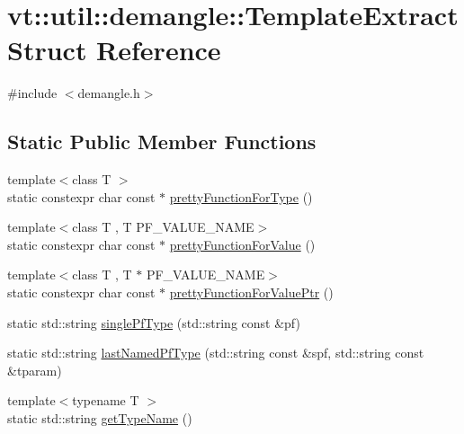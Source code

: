 \hypertarget{structvt_1_1util_1_1demangle_1_1_template_extract}{}\section{vt\+:\+:util\+:\+:demangle\+:\+:Template\+Extract Struct Reference}
\label{structvt_1_1util_1_1demangle_1_1_template_extract}


{\ttfamily \#include $<$demangle.\+h$>$}

\subsection*{Static Public Member Functions}
\begin{DoxyCompactItemize}
\item 
{\footnotesize template$<$class T $>$ }\\static constexpr char const  $\ast$ \hyperlink{structvt_1_1util_1_1demangle_1_1_template_extract_a544c77a181038fc1de063fe3d3fc761d}{pretty\+Function\+For\+Type} ()
\item 
{\footnotesize template$<$class T , T P\+F\+\_\+\+V\+A\+L\+U\+E\+\_\+\+N\+A\+ME$>$ }\\static constexpr char const  $\ast$ \hyperlink{structvt_1_1util_1_1demangle_1_1_template_extract_a2fa8ebf7aca434dc7bf6c3113b04226b}{pretty\+Function\+For\+Value} ()
\item 
{\footnotesize template$<$class T , T $\ast$ P\+F\+\_\+\+V\+A\+L\+U\+E\+\_\+\+N\+A\+ME$>$ }\\static constexpr char const  $\ast$ \hyperlink{structvt_1_1util_1_1demangle_1_1_template_extract_a1fc274aa3088c6c65c5da2450896d6bf}{pretty\+Function\+For\+Value\+Ptr} ()
\item 
static std\+::string \hyperlink{structvt_1_1util_1_1demangle_1_1_template_extract_a5b76d8ad80e5054d4da8bea682a1752d}{single\+Pf\+Type} (std\+::string const \&pf)
\item 
static std\+::string \hyperlink{structvt_1_1util_1_1demangle_1_1_template_extract_a8fe842098a300f5b31f5ab1b0a76804b}{last\+Named\+Pf\+Type} (std\+::string const \&spf, std\+::string const \&tparam)
\item 
{\footnotesize template$<$typename T $>$ }\\static std\+::string \hyperlink{structvt_1_1util_1_1demangle_1_1_template_extract_a78ecb83a83712ee88bbeacfb49cbf538}{get\+Type\+Name} ()
\item 

\end{DoxyCompactItemize}
